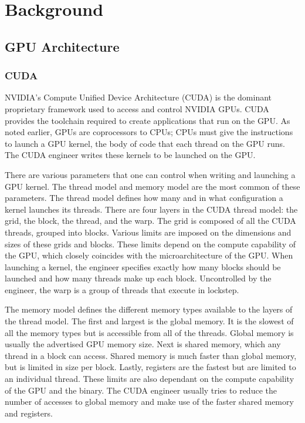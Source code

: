 \chapter{Background}
\label{chap:background}
\section{GPU Architecture}

\subsection{CUDA}

NVIDIA's Compute Unified Device Architecture (CUDA) is the dominant proprietary framework used to access and control NVIDIA GPUs.
CUDA provides the toolchain required to create applications that run on the GPU.
As noted earlier, GPUs are coprocessors to CPUs; CPUs must give the instructions to launch a GPU kernel, the body of code that each thread on the GPU runs.
The CUDA engineer writes these kernels to be launched on the GPU.

There are various parameters that one can control when writing and launching a GPU kernel.
The thread model and memory model are the most common of these parameters.
The thread model defines how many and in what configuration a kernel launches its threads.
There are four layers in the CUDA thread model: the grid, the block, the thread, and the warp.
The grid is composed of all the CUDA threads, grouped into blocks.
Various limits are imposed on the dimensions and sizes of these grids and blocks.
These limits depend on the compute capability of the GPU, which closely coincides with the microarchitecture of the GPU.
When launching a kernel, the engineer specifies exactly how many blocks should be launched and how many threads make up each block.
Uncontrolled by the engineer, the warp is a group of threads that execute in lockstep.

The memory model defines the different memory types available to the layers of the thread model.
The first and largest is the global memory.
It is the slowest of all the memory types but is accessible from all of the threads.
Global memory is usually the advertised GPU memory size.
Next is shared memory, which any thread in a block can access.
Shared memory is much faster than global memory, but is limited in size per block.
Lastly, registers are the fastest but are limited to an individual thread.
These limits are also dependant on the compute capability of the GPU and the binary.
The CUDA engineer usually tries to reduce the number of accesses to global memory and make use of the faster shared memory and registers.

